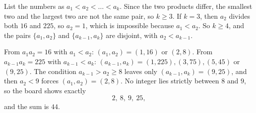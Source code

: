 List the numbers as $a_1<a_2<\dots<a_k$. Since the two products differ, the smallest two and the largest two are not the same pair, so $k\ge3$. If $k=3$, then $a_2$ divides both $16$ and $225$, so $a_2=1$, which is impossible because $a_1<a_2$. So $k\ge4$, and the pairs $\{a_1,a_2\}$ and $\{a_{k-1},a_k\}$ are disjoint, with $a_2<a_{k-1}$.

From $a_1a_2=16$ with $a_1<a_2$: $(a_1,a_2)=(1,16)$ or $(2,8)$. From $a_{k-1}a_k=225$ with $a_{k-1}<a_k$: $(a_{k-1},a_k)=(1,225),(3,75),(5,45)$ or $(9,25)$. The condition $a_{k-1}>a_2\ge8$ leaves only $(a_{k-1},a_k)=(9,25)$, and then $a_2<9$ forces $(a_1,a_2)=(2,8)$. No integer lies strictly between $8$ and $9$, so the board shows exactly
\[
2,\ 8,\ 9,\ 25,
\]
and the sum is $\boxed{44}$.
